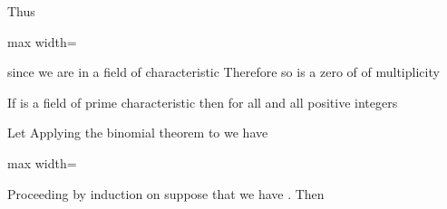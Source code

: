 \documentclass[11pt,oneside]{article}
\begin{document}
\BookNarrativetrue

\begin{BookBody}

\noindent Thus

\begin{center}\begin{adjustbox}{max width=\linewidth}\end{adjustbox}\end{center}

\noindent since we are in a field of characteristic  Therefore so \BookInline{\alpha } is a zero of  of multiplicity \BookEnd{\blacklozenge}

 If  is a field of prime characteristic  then  for all  and all positive integers 

 Let  Applying the binomial theorem to  we have

\begin{center}\begin{adjustbox}{max width=\linewidth}\end{adjustbox}\end{center}

\noindent Proceeding by induction on  suppose that we have . Then  \BookEnd{\blacklozenge}


\end{BookBody}
\end{document}
